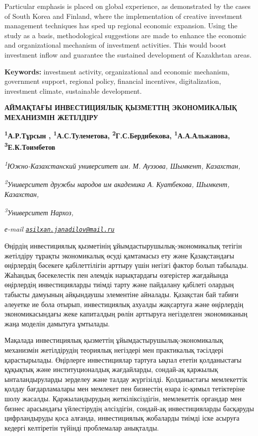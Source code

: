 Particular emphasis is placed on global experience, as demonstrated by
the cases of South Korea and Finland, where the implementation of
creative investment management techniques has sped up regional economic
expansion. Using the study as a basis, methodological suggestions are
made to enhance the economic and organizational mechanism of investment
activities. This would boost investment inflow and guarantee the
sustained development of Kazakhstan areas.

{\bfseries Keywords:} investment activity, organizational and economic
mechanism, government support, regional policy, financial incentives,
digitalization, investment climate, sustainable development.

\begin{articleheader}
{\bfseries АЙМАҚТАҒЫ ИНВЕСТИЦИЯЛЫҚ ҚЫЗМЕТТІҢ ЭКОНОМИКАЛЫҚ МЕХАНИЗМІН ЖЕТІЛДІРУ}

{\bfseries \textsuperscript{1}А.Р.Тұрсын \textsuperscript{\envelope },
\textsuperscript{1}А.С.Тулеметова,
\textsuperscript{2}Г.С.Бердибекова,
\textsuperscript{1}А.А.Альжанова,
\textsuperscript{3}Е.К.Тоимбетов}
\end{articleheader}

\begin{affiliation}
\emph{\textsuperscript{1}Южно-Казахстанский университет им. М. Ауэзова,
Шымкент, Казахстан,}

\emph{\textsuperscript{2}Университет дружбы народов им академика А.
Куатбекова, Шымкент, Казахстан,}

\emph{\textsuperscript{3}Университет Нархоз,}

\emph{е-mail \href{mailto:asilxan.janadilov@mail.ru}{\nolinkurl{asilxan.janadilov@mail.ru}}}
\end{affiliation}

Өңірдің инвестициялық қызметінің ұйымдастырушылық-экономикалық тетігін
жетілдіру тұрақты экономикалық өсуді қамтамасыз ету және Қазақстандағы
өңірлердің бәсекеге қабілеттілігін арттыру үшін негізгі фактор болып
табылады. Жаһандық бәсекелестік пен әлемдік нарықтардағы өзгерістер
жағдайында өңірлердің инвестицияларды тиімді тарту және пайдалану
қабілеті олардың табысты дамуының айқындаушы элементіне айналады.
Қазақстан бай табиғи әлеуетке ие бола отырып, инвестициялық ахуалды
жақсартуға және өңірлердің экономикасындағы жеке капиталдың рөлін
арттыруға негізделген экономиканың жаңа моделін дамытуға ұмтылады.

Мақалада инвестициялық қызметтің ұйымдастырушылық-экономикалық
механизмін жетілдірудің теориялық негіздері мен практикалық тәсілдері
қарастырылады. Өңірлерге инвестициялар тартуға ықпал ететін қолданыстағы
құқықтық және институционалдық жағдайларды, сондай-ақ қаржылық
ынталандыруларды зерделеу және талдау жүргізілді. Қолданыстағы
мемлекеттік қолдау бағдарламалары мен мемлекет пен бизнестің өзара
іс-қимыл тетіктеріне шолу жасалды. Қаржыландырудың жеткіліксіздігін,
мемлекеттік органдар мен бизнес арасындағы үйлестірудің әлсіздігін,
сондай-ақ инвестицияларды басқаруды цифрландыруды қоса алғанда,
инвестициялық жобаларды тиімді іске асыруға кедергі келтіретін түйінді
проблемалар анықталды.

